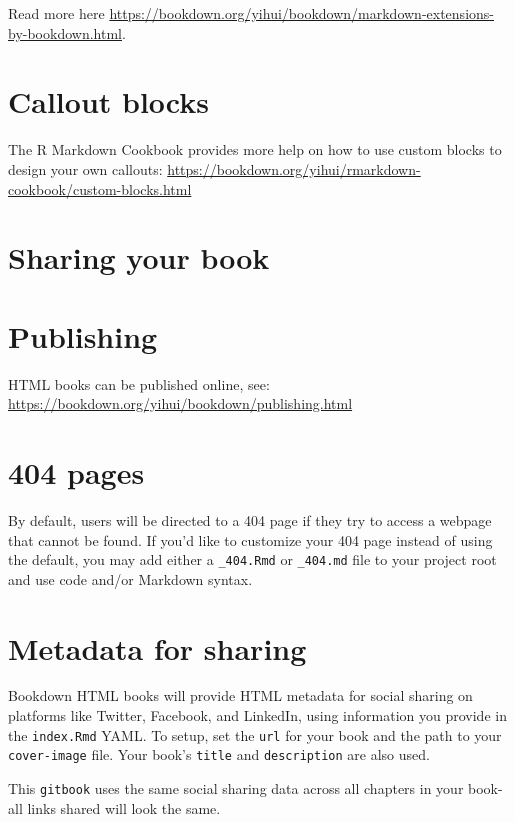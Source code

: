 \documentclass[
]{book}
\theoremstyle{definition}
\theoremstyle{definition}
\theoremstyle{definition}
\theoremstyle{definition}
\theoremstyle{remark}
\begin{document}
Read more here \url{https://bookdown.org/yihui/bookdown/markdown-extensions-by-bookdown.html}.

\section{Callout blocks}\label{callout-blocks}

The R Markdown Cookbook provides more help on how to use custom blocks to design your own callouts: \url{https://bookdown.org/yihui/rmarkdown-cookbook/custom-blocks.html}

\section{Sharing your book}\label{sharing-your-book}

\section{Publishing}\label{publishing}

HTML books can be published online, see: \url{https://bookdown.org/yihui/bookdown/publishing.html}

\section{404 pages}\label{pages}

By default, users will be directed to a 404 page if they try to access a webpage that cannot be found. If you'd like to customize your 404 page instead of using the default, you may add either a \texttt{\_404.Rmd} or \texttt{\_404.md} file to your project root and use code and/or Markdown syntax.

\section{Metadata for sharing}\label{metadata-for-sharing}

Bookdown HTML books will provide HTML metadata for social sharing on platforms like Twitter, Facebook, and LinkedIn, using information you provide in the \texttt{index.Rmd} YAML. To setup, set the \texttt{url} for your book and the path to your \texttt{cover-image} file. Your book's \texttt{title} and \texttt{description} are also used.

This \texttt{gitbook} uses the same social sharing data across all chapters in your book- all links shared will look the same.
\end{document}
